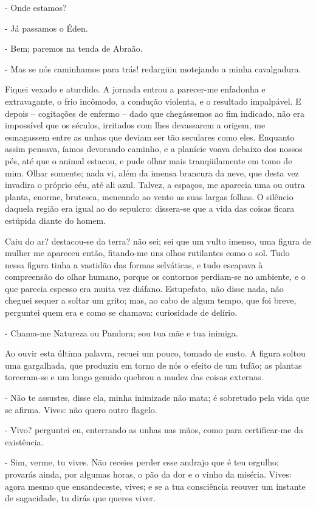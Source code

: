 \begin{corollary}
- Onde estamos?

- Já passamos o Éden.

- Bem; paremos na tenda de Abraão.

- Mas se nós caminhamos para trás! redargüiu motejando a minha cavalgadura.

Fiquei vexado e aturdido. A jornada entrou a parecer-me enfadonha e extravagante, o frio incômodo, a condução violenta, e o resultado impalpável. E depois -- cogitações de enfermo -- dado que chegássemos ao fim indicado, não era impossível que os séculos, irritados com lhes devassarem a origem, me esmagassem entre as unhas que deviam ser tão seculares como eles. Enquanto assim pensava, íamos devorando caminho, e a planície voava debaixo dos nossos pés, até que o animal estacou, e pude olhar mais tranqüilamente em tomo de mim. Olhar somente; nada vi, além da imensa brancura da neve, que desta vez invadira o próprio céu, até ali azul. Talvez, a espaços, me aparecia uma ou outra planta, enorme, brutesca, meneando ao vento as suas largas folhas. O silêncio daquela região era igual ao do sepulcro: dissera-se que a vida das coisas ficara estúpida diante do homem.

Caiu do ar? destacou-se da terra? não sei; sei que um vulto imenso, uma figura de mulher me apareceu então, fitando-me uns olhos rutilantes como o sol. Tudo nessa figura tinha a vastidão das formas selváticas, e tudo escapava à compreensão do olhar humano, porque os contornos perdiam-se no ambiente, e o que parecia espesso era muita vez diáfano. Estupefato, não disse nada, não cheguei sequer a soltar um grito; mas, ao cabo de algum tempo, que foi breve, perguntei quem era e como se chamava: curiosidade de delírio.

- Chama-me Natureza ou Pandora; sou tua mãe e tua inimiga.

Ao ouvir esta última palavra, recuei um pouco, tomado de susto. A figura soltou uma gargalhada, que produziu em torno de nós o efeito de um tufão; as plantas torceram-se e um longo gemido quebrou a mudez das coisas externas.

- Não te assustes, disse ela, minha inimizade não mata; é sobretudo pela vida que se afirma. Vives: não quero outro flagelo.

- Vivo? perguntei eu, enterrando as unhas nas mãos, como para certificar-me da existência.

- Sim, verme, tu vives. Não receies perder esse andrajo que é teu orgulho; provarás ainda, por algumas horas, o pão da dor e o vinho da miséria. Vives: agora mesmo que ensandeceste, vives; e se a tua consciência reouver um instante de sagacidade, tu dirás que queres viver.


\end{corollary}
